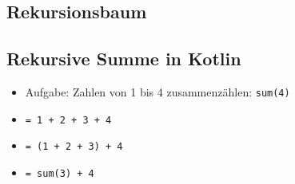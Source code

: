 \subsection{Rekursionsbaum}

\newcommand{\mytree}{
    \ifnum \val = 0
        \draw[draw=., ultra thick] (\x,\y) rectangle 	++(0.75,0.75);
        \node at (\x+0.375,\y+0.375) {f(\the\val)};
    \fi
    \ifnum \val = 1
        \draw[draw=., ultra thick] (\x,\y) rectangle 	++(0.75,0.75);
        \node at (\x+0.375,\y+0.375) {f(\the\val)};
    \fi
    \ifnum \val > 1

        \draw[draw=., ultra thick] (\x,\y) rectangle ++(0.75,0.75);
        \node at (\x+0.375,\y+0.375) {f(\the\val)};

        \advance \val -1
        \advance \y -2
        \tmp=-\val*0.01
        \advance \tmp -1

        \advance \x \tmp
        \draw [->, thick] (\x-\tmp,\y+2) -- (\x+0.75,\y+0.75);
        \mytree;

        \tmp=\val*0.01
        \advance \tmp 1

        \advance \x \tmp
        \advance \val -1
        \tmp=\val*0.01
        \advance \tmp 1

        \advance \x \tmp

        \draw [->, thick] (\x-\tmp+0.75,\y+2) -- (\x,\y+0.75);
        \mytree;

        \tmp=-\val*0.01
        \advance \tmp -1

        \advance \val +2
        \advance \x \tmp
        \advance \y +2
    \fi
}


\begin{frame}
    \slidehead
    \centering
    \vspace{-0.1cm}
\end{frame}

\subsection{Rekursive Summe in Kotlin}
\begin{frame}
    \slidehead

    \begin{itemize}
        \item Aufgabe: Zahlen von 1 bis 4 zusammenzählen: \texttt{sum(4)} \pause
        \item \texttt{= 1 + 2 + 3 + 4} \pause
        \item \texttt{= (1 + 2 + 3) + 4} \pause
        \item \texttt{= sum(3) + 4}
    \end{itemize}
    \vspace{1em}
    \pause
\end{frame}

